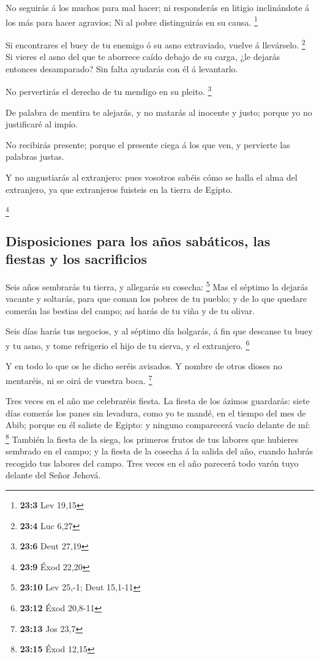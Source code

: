  No seguirás á los muchos para mal hacer; ni responderás
en litigio inclinándote á los más para hacer agravios;  Ni
al pobre distinguirás en su causa. \footnote{\textbf{23:3} Lev 19,15}

 Si encontrares el buey de tu enemigo ó su asno
extraviado, vuelve á llevárselo. \footnote{\textbf{23:4} Luc 6,27}
 Si vieres el asno del que te aborrece caído debajo de su
carga, ¿le dejarás entonces desamparado? Sin falta ayudarás con él á
levantarlo.

 No pervertirás el derecho de tu mendigo en su pleito.
\footnote{\textbf{23:6} Deut 27,19}

 De palabra de mentira te alejarás, y no matarás al
inocente y justo; porque yo no justificaré al impío.

 No recibirás presente; porque el presente ciega á los que
ven, y pervierte las palabras justas.

 Y no angustiarás al extranjero: pues vosotros sabéis cómo
se halla el alma del extranjero, ya que extranjeros fuisteis en la
tierra de Egipto.

\footnote{\textbf{23:9} Éxod 22,20}

\hypertarget{disposiciones-para-los-auxf1os-sabuxe1ticos-las-fiestas-y-los-sacrificios}{%
\subsection{Disposiciones para los años sabáticos, las fiestas y los
sacrificios}\label{disposiciones-para-los-auxf1os-sabuxe1ticos-las-fiestas-y-los-sacrificios}}

 Seis años sembrarás tu tierra, y allegarás su cosecha:
\footnote{\textbf{23:10} Lev 25,-1; Deut 15,1-11}  Mas el
séptimo la dejarás vacante y soltarás, para que coman los pobres de tu
pueblo; y de lo que quedare comerán las bestias del campo; así harás de
tu viña y de tu olivar.

 Seis días harás tus negocios, y al séptimo día holgarás,
á fin que descanse tu buey y tu asno, y tome refrigerio el hijo de tu
sierva, y el extranjero. \footnote{\textbf{23:12} Éxod 20,8-11}

 Y en todo lo que os he dicho seréis avisados. Y nombre
de otros dioses no mentaréis, ni se oirá de vuestra boca. \footnote{\textbf{23:13}
  Jos 23,7}

 Tres veces en el año me celebraréis fiesta.
 La fiesta de los ázimos guardarás: siete días comerás
los panes sin levadura, como yo te mandé, en el tiempo del mes de Abib;
porque en él saliste de Egipto: y ninguno comparecerá vacío delante de
mí: \footnote{\textbf{23:15} Éxod 12,15}  También la
fiesta de la siega, los primeros frutos de tus labores que hubieres
sembrado en el campo; y la fiesta de la cosecha á la salida del año,
cuando habrás recogido tus labores del campo.  Tres veces
en el año parecerá todo varón tuyo delante del Señor Jehová.

